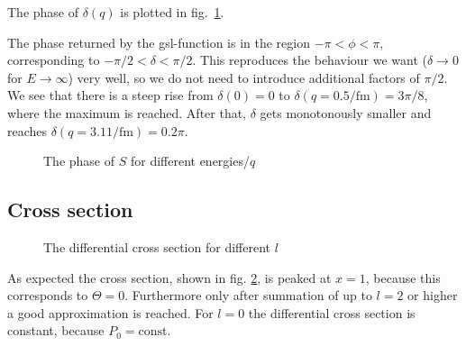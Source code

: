 \documentclass{scrartcl}
\begin{document}
The phase of $\delta(q)$ is plotted in fig.~\ref{fig:delta}.

The phase returned by the gsl-function is in the region $-\pi<\phi<\pi$, corresponding to $-\pi/2<\delta<\pi/2$. This reproduces the behaviour we want ($\delta\to 0$ for $E\to\infty$) very well, so we do not need to introduce additional factors of $\pi/2$. We see that there is a steep rise from $\delta(0)=0$ to $\delta(q=0.5\si{\per\femto\meter})=3\pi/8$, where the maximum is reached. After that, $\delta$ gets monotonously smaller and reaches $\delta(q=3.11\si{\per\femto\meter})=0.2\pi$.

\begin{figure}[htbp]
	
	\caption{The phase of $S$ for different energies/$q$}
	\label{fig:delta}
\end{figure}

\subsection{Cross section}

\begin{figure}[htbp]
	
	\caption{The differential cross section for different $l$}
	\label{fig:crossect}
\end{figure}
As expected the cross section, shown in fig. \ref{fig:crossect}, is peaked at $x=1$, because this corresponds to $\Theta=0$. Furthermore only after summation of up to $l=2$ or higher a good approximation is reached. For $l=0$ the differential cross section is constant, because $P_0=\text{const}$.
\newpage
\listoffigures
\listoftables
\printbibliography
\end{document}
